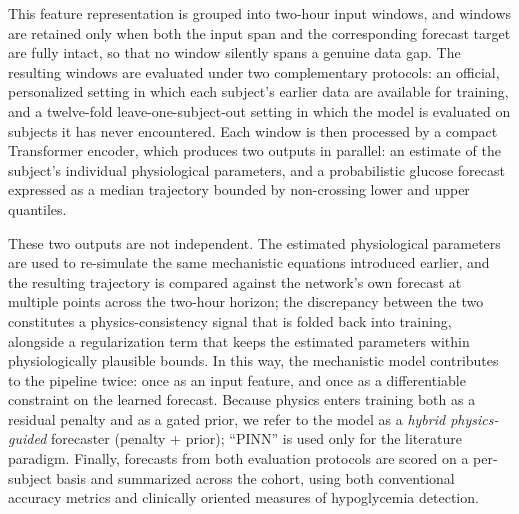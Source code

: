 \documentclass[journal]{IEEEtran}
\begin{document}
This feature representation is grouped into two-hour input windows, and windows are retained only when both the input span and the corresponding forecast target are fully intact, so that no window silently spans a genuine data gap. The resulting windows are evaluated under two complementary protocols: an official, personalized setting in which each subject's earlier data are available for training, and a twelve-fold leave-one-subject-out setting in which the model is evaluated on subjects it has never encountered. Each window is then processed by a compact Transformer encoder, which produces two outputs in parallel: an estimate of the subject's individual physiological parameters, and a probabilistic glucose forecast expressed as a median trajectory bounded by non-crossing lower and upper quantiles.

These two outputs are not independent. The estimated physiological parameters are used to re-simulate the same mechanistic equations introduced earlier, and the resulting trajectory is compared against the network's own forecast at multiple points across the two-hour horizon; the discrepancy between the two constitutes a physics-consistency signal that is folded back into training, alongside a regularization term that keeps the estimated parameters within physiologically plausible bounds. In this way, the mechanistic model contributes to the pipeline twice: once as an input feature, and once as a differentiable constraint on the learned forecast. Because physics enters training both as a residual penalty and as a gated prior, we refer to the model as a \emph{hybrid physics-guided} forecaster (penalty + prior); ``PINN'' is used only for the literature paradigm. Finally, forecasts from both evaluation protocols are scored on a per-subject basis and summarized across the cohort, using both conventional accuracy metrics and clinically oriented measures of hypoglycemia detection.
\end{document}
